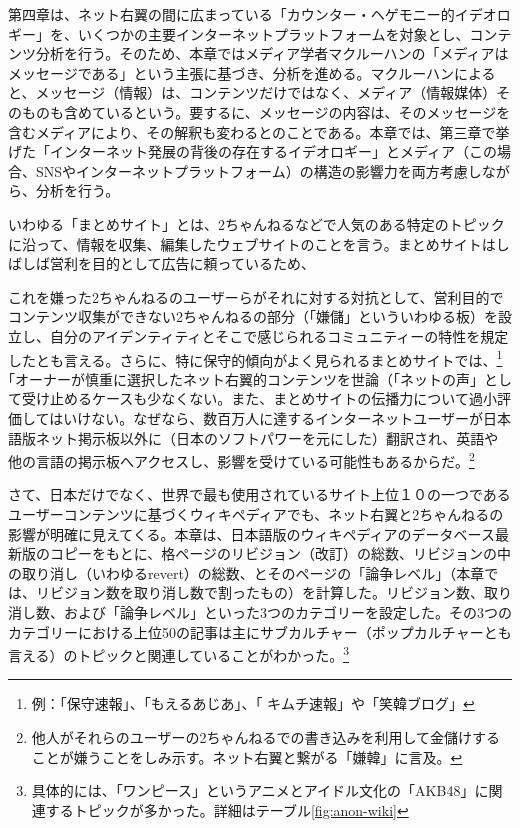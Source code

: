 \documentclass[10pt,british,A4paper,twoside]{memoir}
\begin{document}
第四章は、ネット右翼の間に広まっている「カウンター・ヘゲモニー的イデオロギー」を、いくつかの主要インターネットプラットフォームを対象とし、コンテンツ分析を行う。そのため、本章ではメディア学者マクルーハンの「メディアはメッセージである」という主張に基づき、分析を進める。マクルーハンによると、メッセージ（情報）は、コンテンツだけではなく、メディア（情報媒体）そのものも含めているという。要するに、メッセージの内容は、そのメッセージを含むメディアにより、その解釈も変わるとのことである。本章では、第三章で挙げた「インターネット発展の背後の存在するイデオロギー」とメディア（この場合、SNSやインターネットプラットフォーム）の構造の影響力を両方考慮しながら、分析を行う。

いわゆる「まとめサイト」とは、2ちゃんねるなどで人気のある特定のトピックに沿って、情報を収集、編集したウェブサイトのことを言う。まとめサイトはしばしば営利を目的として広告に頼っているため、

これを嫌った2ちゃんねるのユーザーらがそれに対する対抗として、営利目的でコンテンツ収集ができない2ちゃんねるの部分（「嫌儲」といういわゆる板）を設立し、自分のアイデンティティとそこで感じられるコミュニティーの特性を規定したとも言える。さらに、特に保守的傾向がよく見られるまとめサイトでは、\footnote{例：「保守速報」、「もえるあじあ」、「
  キムチ速報」や「笑韓ブログ」}｢オーナーが慎重に選択したネット右翼的コンテンツを世論（「ネットの声」として受け止めるケースも少なくない。また、まとめサイトの伝播力について過小評価してはいけない。なぜなら、数百万人に達するインターネットユーザーが日本語版ネット掲示板以外に（日本のソフトパワーを元にした）翻訳され、英語や他の言語の掲示板へアクセスし、影響を受けている可能性もあるからだ。\footnote{他人がそれらのユーザーの2ちゃんねるでの書き込みを利用して金儲けすることが嫌うことをしみ示す。ネット右翼と繋がる「嫌韓」に言及。}

さて、日本だけでなく、世界で最も使用されているサイト上位１０の一つであるユーザーコンテンツに基づくウィキペディアでも、ネット右翼と2ちゃんねるの影響が明確に見えてくる。本章は、日本語版のウィキペディアのデータベース最新版のコピーをもとに、格ページのリビジョン（改訂）の総数、リビジョンの中の取り消し（いわゆるrevert）の総数、とそのページの「論争レベル」（本章では、リビジョン数を取り消し数で割ったもの）を計算した。リビジョン数、取り消し数、および「論争レベル」といった3つのカテゴリーを設定した。その3つのカテゴリーにおける上位50の記事は主にサブカルチャー（ポップカルチャーとも言える）のトピックと関連していることがわかった。\footnote{具体的には、「ワンピース」というアニメとアイドル文化の「AKB48」に関連するトピックが多かった。詳細はテーブル\ref{fig:anon-wiki}}
\end{document}
